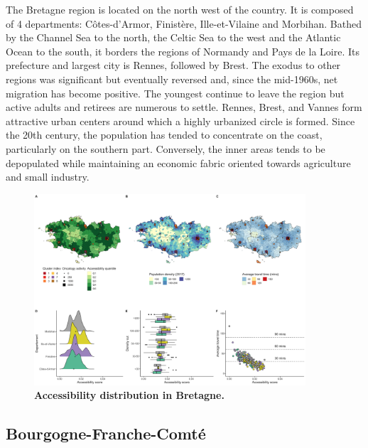 The Bretagne region is located on the north west of the country. It is composed of 4 departments: Côtes-d'Armor, Finistère, Ille-et-Vilaine and Morbihan. Bathed by the Channel Sea to the north, the Celtic Sea to the west and the Atlantic Ocean to the south, it borders the regions of Normandy and Pays de la Loire. Its prefecture and largest city is Rennes, followed by Brest.
The exodus to other regions was significant but eventually reversed and, since the mid-1960s, net migration has become positive. The youngest continue to leave the region but active adults and retirees are numerous to settle. Rennes, Brest, and Vannes form attractive urban centers around which a highly urbanized circle is formed. Since the 20th century, the population has tended to concentrate on the coast, particularly on the southern part. Conversely, the inner areas tends to be depopulated while maintaining an economic fabric oriented towards agriculture and small industry.

\begin{figure}[H]
    \includegraphics[width=0.9\textwidth]{images/camion/region_accessibility/accessibility_Bretagne.png}
    \centering
    \caption{
        \textbf{Accessibility distribution in Bretagne.}
    }
\end{figure}

\subsection*{Bourgogne-Franche-Comté}

